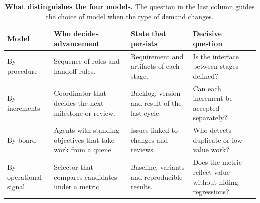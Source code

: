 \documentclass[11pt,a4paper]{article}
\newcommand{\hd}[1]{\textcolor{ink}{\bfseries #1}}
\begin{document}
\begin{table}[!ht]
\caption{\textbf{What distinguishes the four models.} The question in the last column guides the choice of model when the type of demand changes.}\label{tab:modelos}
\small\renewcommand{\arraystretch}{1.20}\setlength{\tabcolsep}{4pt}
\begin{tabularx}{\linewidth}{@{}L{2.7cm}YYY@{}}
\toprule\hd{Model} & \hd{Who decides advancement} & \hd{State that persists} & \hd{Decisive question}\\\midrule
By procedure & Sequence of roles and handoff rules. & Requirement and artifacts of each stage. & Is the interface between stages defined?\\
By increments & Coordinator that decides the next milestone or review. & Backlog, version and result of the last cycle. & Can each increment be accepted separately?\\
By board & Agents with standing objectives that take work from a queue. & Issues linked to changes and reviews. & Who detects duplicate or low-value work?\\
By operational signal & Selector that compares candidates under a metric. & Baseline, variants and reproducible results. & Does the metric reflect value without hiding regressions?\\
\bottomrule\end{tabularx}
\end{table}
\end{document}
